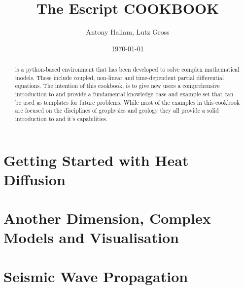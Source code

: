 \documentclass{manual}
\title{The Escript COOKBOOK}
\author{Antony Hallam, Lutz Gross}
\date{\today}
\begin{document}
\maketitle



\begin{abstract}
\esc is a python-based environment that has been developed to solve complex mathematical models. These include coupled, non-linear and time-dependent partial differential equations. The intention of this cookbook, is to give new \esc users a comprehensive introduction to \esc and provide a fundamental \esc knowledge base and example set that can be used as templates for future problems. While most of the examples in this cookbook are focused on the disciplines of geophysics and geology they all provide a solid introduction to \esc and it's capabilities.  
\end{abstract}
\tableofcontents

\newpage




\chapter{Getting Started with Heat Diffusion}
\label{CHAP HEAT DIFF}



\chapter{Another Dimension, Complex Models and Visualisation}
\label{CHAP HEAT 2}



\chapter{Seismic Wave Propagation}

\end{document}
